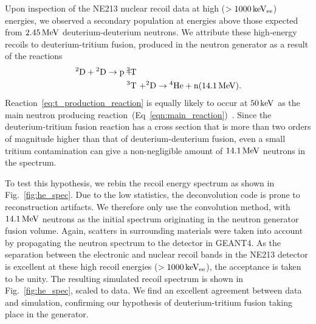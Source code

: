 Upon inspection of the NE213 nuclear recoil data at high ($>1000\,\mathrm{keV_{ee}}$) energies, we observed a secondary population at energies above those expected from $2.45\,\mathrm{MeV}$ deuterium-deuterium neutrons. We attribute these high-energy recoils to deuterium-tritium fusion, produced in the neutron generator as a result of the reactions
\begin{eqnarray}
{}^2\mathrm{D} + {}^2\mathrm{D} \rightarrow \mathrm{p}\, + &\!\!\!\!{}^3\mathrm{T}\!\!\!\!& \label{eq:t_production_reaction} \\
&\!\!\!\!^3\mathrm{T}\!\!\!\!& + {}^2\mathrm{D} \rightarrow {}^4\mathrm{He} + \mathrm{n}(14.1\1{MeV}).
\end{eqnarray}
Reaction~\eqref{eq:t_production_reaction} is equally likely to occur at $50\,\mathrm{keV}$ as the main neutron producing reaction~(Eq~\eqref{eqn:main_reaction})~\cite{Huba:2013}. Since the deuterium-tritium fusion reaction has a cross section that is more than two orders of magnitude higher than that of deuterium-deuterium fusion, even a small tritium contamination can give a non-negligible amount of $14.1\,\mathrm{MeV}$ neutrons in the spectrum.

To test this hypothesis, we rebin the recoil energy spectrum as shown in Fig.~\ref{fig:he_spec}. Due to the low statistics, the deconvolution code is prone to reconstruction artifacts. We therefore only use the convolution method, with $14.1\,\mathrm{MeV}$ neutrons as the initial spectrum originating in the neutron generator fusion volume. Again, scatters in surrounding materials were taken into account by propagating the neutron spectrum to the detector in GEANT4. As the separation between the electronic and nuclear recoil bands in the NE213 detector is excellent at these high recoil energies ($>1000\,\mathrm{keV_{ee}}$), the acceptance is taken to be unity. The resulting simulated recoil spectrum is shown in Fig.~\ref{fig:he_spec}, scaled to data. We find an excellent agreement between data and simulation, confirming our hypothesis of deuterium-tritium fusion taking place in the generator.


